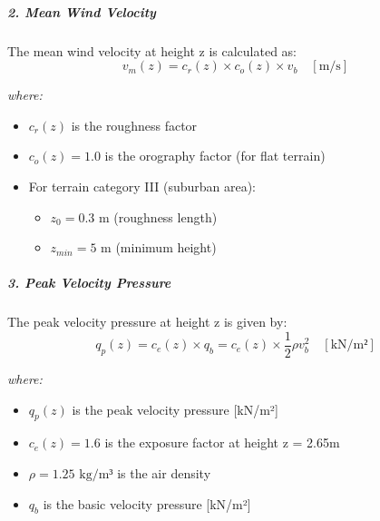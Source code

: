 \documentclass[12pt,a4paper]{article}
\begin{document}
\subparagraph{2. Mean Wind Velocity}
The mean wind velocity at height z is calculated as:
\begin{equation}
v_m(z) = c_r(z) \times c_o(z) \times v_b \quad [\text{m/s}]
\end{equation}

\noindent
\textit{where:}
\begin{itemize}
    \item $c_r(z)$ is the roughness factor
    \item $c_o(z) = 1.0$ is the orography factor (for flat terrain)
    \item For terrain category III (suburban area):
        \begin{itemize}
            \item $z_0 = 0.3 \text{ m}$ (roughness length)
            \item $z_{min} = 5 \text{ m}$ (minimum height)
        \end{itemize}
\end{itemize}

\subparagraph{3. Peak Velocity Pressure}
The peak velocity pressure at height z is given by:
\begin{equation}
q_p(z) = c_e(z) \times q_b = c_e(z) \times \frac{1}{2} \rho v_{b}^2 \quad [\text{kN/m²}]
\end{equation}

\noindent
\textit{where:}
\begin{itemize}
    \item $q_p(z)$ is the peak velocity pressure [kN/m²]
    \item $c_e(z) = 1.6$ is the exposure factor at height z = 2.65m
    \item $\rho = 1.25 \text{ kg/m³}$ is the air density
    \item $q_b$ is the basic velocity pressure [kN/m²]
\end{itemize}
\end{document}
